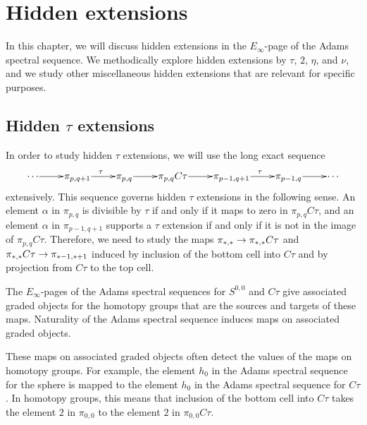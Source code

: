 \chapter{Hidden extensions}
\label{ch:hidden}

In this chapter, we will discuss hidden extensions
in the $E_\infty$-page of the Adams spectral sequence.
We methodically explore hidden extensions by
$\tau$, $2$, $\eta$, and $\nu$, and we study other miscellaneous
hidden extensions that are relevant for specific purposes.

\section{Hidden $\tau$ extensions}
\label{sctn:tau-extn}

In order to study hidden $\tau$ extensions,
we will use the long exact sequence
\begin{equation}
\label{eq:LES-Ctau}
\xymatrix@1{
\cdots \ar[r] & \pi_{p,q+1} \ar[r]^\tau & \pi_{p,q} \ar[r] & 
\pi_{p,q} C\tau \ar[r] & 
\pi_{p-1,q+1} \ar[r]^\tau & \pi_{p-1,q} \ar[r] & \cdots
}
\end{equation}
extensively.
This sequence governs hidden $\tau$ extensions in the following sense.
An element $\alpha$ in $\pi_{p,q}$ is divisible by $\tau$
if and only if it maps to zero in $\pi_{p,q} C\tau$,
and an element $\alpha$ in $\pi_{p-1,q+1}$ supports a $\tau$ extension
if and only if it is not in the image of $\pi_{p,q} C\tau$.
Therefore, we need to study the maps
$\pi_{*,*} \rightarrow \pi_{*,*} C\tau$ and
$\pi_{*,*} C\tau \rightarrow \pi_{*-1,*+1}$
induced by inclusion of the bottom cell into $C\tau$
and by projection from $C\tau$ to the top cell.

The $E_\infty$-pages of the Adams spectral sequences for $S^{0,0}$ and
$C\tau$ give associated graded objects for the homotopy groups that 
are the sources and targets of these maps.  Naturality of the
Adams spectral sequence induces maps on associated graded objects.

These maps on associated graded objects often detect the values
of the maps on homotopy groups.  For example, the element
$h_0$ in the Adams spectral sequence for the sphere is mapped to the
element $h_0$ in the Adams spectral sequence for $C\tau$.
In homotopy groups, this means that inclusion of the bottom cell into
$C\tau$ takes the element $2$ in $\pi_{0,0}$ to the
element $2$ in $\pi_{0,0} C\tau$.

